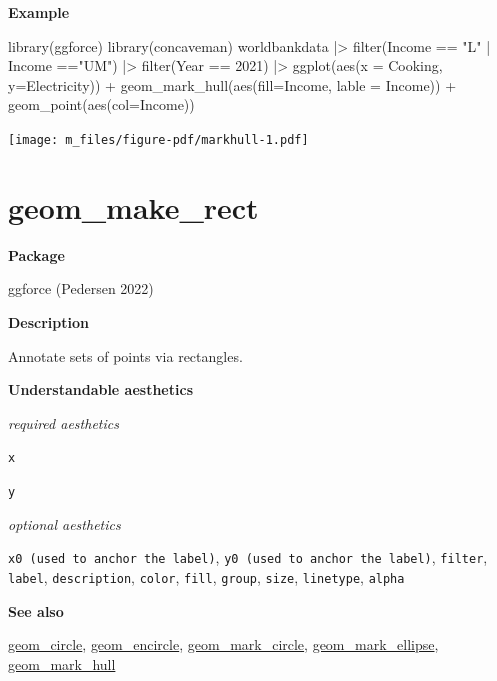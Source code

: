 \documentclass[
  letterpaper,
  DIV=11,
  numbers=noendperiod]{scrreprt}
\newenvironment{Shaded}{\begin{snugshade}}{\end{snugshade}}
\newcommand{\AttributeTok}[1]{\textcolor[rgb]{0.40,0.45,0.13}{#1}}
\newcommand{\DecValTok}[1]{\textcolor[rgb]{0.68,0.00,0.00}{#1}}
\newcommand{\FunctionTok}[1]{\textcolor[rgb]{0.28,0.35,0.67}{#1}}
\newcommand{\NormalTok}[1]{\textcolor[rgb]{0.00,0.23,0.31}{#1}}
\newcommand{\SpecialCharTok}[1]{\textcolor[rgb]{0.37,0.37,0.37}{#1}}
\newcommand{\StringTok}[1]{\textcolor[rgb]{0.13,0.47,0.30}{#1}}
\begin{document}
\textbf{Example}

\begin{Shaded}
\begin{Highlighting}[]
\FunctionTok{library}\NormalTok{(ggforce)}
\FunctionTok{library}\NormalTok{(concaveman)}
\NormalTok{worldbankdata }\SpecialCharTok{|\textgreater{}}
  \FunctionTok{filter}\NormalTok{(Income }\SpecialCharTok{==} \StringTok{"L"} \SpecialCharTok{|}\NormalTok{ Income }\SpecialCharTok{==}\StringTok{"UM"}\NormalTok{) }\SpecialCharTok{|\textgreater{}}
  \FunctionTok{filter}\NormalTok{(Year }\SpecialCharTok{==} \DecValTok{2021}\NormalTok{) }\SpecialCharTok{|\textgreater{}}
  \FunctionTok{ggplot}\NormalTok{(}\FunctionTok{aes}\NormalTok{(}\AttributeTok{x =}\NormalTok{ Cooking, }\AttributeTok{y=}\NormalTok{Electricity)) }\SpecialCharTok{+}
  \FunctionTok{geom\_mark\_hull}\NormalTok{(}\FunctionTok{aes}\NormalTok{(}\AttributeTok{fill=}\NormalTok{Income, }\AttributeTok{lable =}\NormalTok{ Income)) }\SpecialCharTok{+}
  \FunctionTok{geom\_point}\NormalTok{(}\FunctionTok{aes}\NormalTok{(}\AttributeTok{col=}\NormalTok{Income))}
\end{Highlighting}
\end{Shaded}

\texttt{[image: m\_files/figure-pdf/markhull-1.pdf]}

\section{geom\_make\_rect}\label{mark_rect}

\textbf{Package}

ggforce (Pedersen 2022)

\textbf{Description}

Annotate sets of points via rectangles.

\textbf{Understandable aesthetics}

\emph{required aesthetics}

\texttt{x}

\texttt{y}

\emph{optional aesthetics}

\texttt{x0\ (used\ to\ anchor\ the\ label)},
\texttt{y0\ (used\ to\ anchor\ the\ label)}, \texttt{filter},
\texttt{label}, \texttt{description}, \texttt{color}, \texttt{fill},
\texttt{group}, \texttt{size}, \texttt{linetype}, \texttt{alpha}

\textbf{See also}

\hyperref[circle]{geom\_circle}, \hyperref[encircle]{geom\_encircle},
\hyperref[mark_circle]{geom\_mark\_circle},
\hyperref[mark_ellipse]{geom\_mark\_ellipse},
\hyperref[mark_hull]{geom\_mark\_hull}
\end{document}
